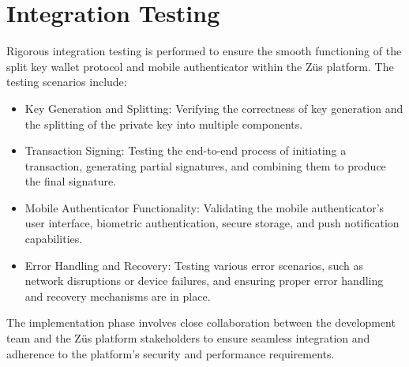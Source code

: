 \section{Integration Testing}
Rigorous integration testing is performed to ensure the smooth functioning of the split key wallet protocol and mobile authenticator within the Züs platform. The testing scenarios include:
\begin{itemize}
    \item Key Generation and Splitting: Verifying the correctness of key generation and the splitting of the private key into multiple components.
    \item Transaction Signing: Testing the end-to-end process of initiating a transaction, generating partial signatures, and combining them to produce the final signature.
    \item Mobile Authenticator Functionality: Validating the mobile authenticator's user interface, biometric authentication, secure storage, and push notification capabilities.
    \item Error Handling and Recovery: Testing various error scenarios, such as network disruptions or device failures, and ensuring proper error handling and recovery mechanisms are in place.
\end{itemize}
The implementation phase involves close collaboration between the development team and the Züs platform stakeholders to ensure seamless integration and adherence to the platform's security and performance requirements.
